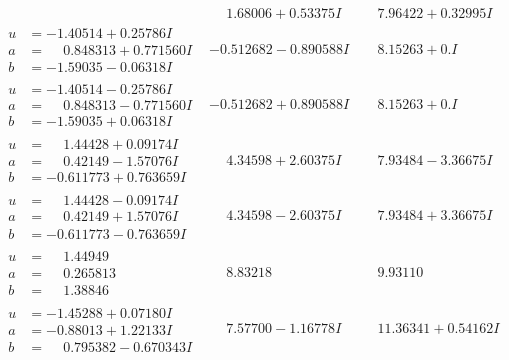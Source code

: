 \documentclass[1p]{elsarticle_modified}
\theoremstyle{definition}
\begin{document}
$$\begin{array}{c|c|c}
 & \phantom{-}1.68006 + 0.53375 I & \phantom{-}7.96422 + 0.32995 I \\ \hline\begin{aligned}
u &= -1.40514 + 0.25786 I \\
a &= \phantom{-}0.848313 + 0.771560 I \\
b &= -1.59035 - 0.06318 I\end{aligned}
 & -0.512682 - 0.890588 I & \phantom{-}8.15263 + 0. I\phantom{ +0.000000I} \\ \hline\begin{aligned}
u &= -1.40514 - 0.25786 I \\
a &= \phantom{-}0.848313 - 0.771560 I \\
b &= -1.59035 + 0.06318 I\end{aligned}
 & -0.512682 + 0.890588 I & \phantom{-}8.15263 + 0. I\phantom{ +0.000000I} \\ \hline\begin{aligned}
u &= \phantom{-}1.44428 + 0.09174 I \\
a &= \phantom{-}0.42149 - 1.57076 I \\
b &= -0.611773 + 0.763659 I\end{aligned}
 & \phantom{-}4.34598 + 2.60375 I & \phantom{-}7.93484 - 3.36675 I \\ \hline\begin{aligned}
u &= \phantom{-}1.44428 - 0.09174 I \\
a &= \phantom{-}0.42149 + 1.57076 I \\
b &= -0.611773 - 0.763659 I\end{aligned}
 & \phantom{-}4.34598 - 2.60375 I & \phantom{-}7.93484 + 3.36675 I \\ \hline\begin{aligned}
u &= \phantom{-}1.44949\phantom{ +0.000000I} \\
a &= \phantom{-}0.265813\phantom{ +0.000000I} \\
b &= \phantom{-}1.38846\phantom{ +0.000000I}\end{aligned}
 & \phantom{-}8.83218\phantom{ +0.000000I} & \phantom{-}9.93110\phantom{ +0.000000I} \\ \hline\begin{aligned}
u &= -1.45288 + 0.07180 I \\
a &= -0.88013 + 1.22133 I \\
b &= \phantom{-}0.795382 - 0.670343 I\end{aligned}
 & \phantom{-}7.57700 - 1.16778 I & \phantom{-}11.36341 + 0.54162 I \\ \hline\begin{aligned}

\end{aligned}
\end{array}$$
\end{document}
